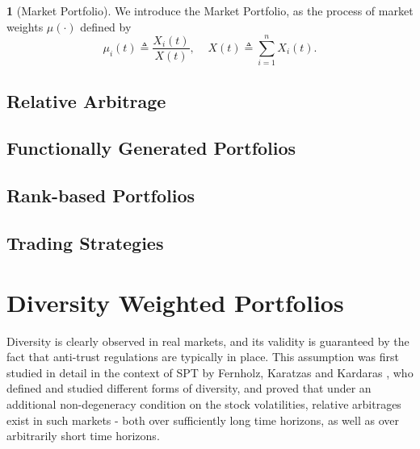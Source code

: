 \documentclass[british]{amsart}
\numberwithin{equation}{section}
\numberwithin{figure}{section}
\theoremstyle{plain}
\theoremstyle{definition}
\newtheorem{defn}[thm]{\protect\definitionname}
\theoremstyle{plain}
\theoremstyle{plain}
\theoremstyle{plain}
\theoremstyle{remark}
\providecommand{\definitionname}{Definition}
\begin{document}
\begin{defn}[Market Portfolio]
We introduce the Market Portfolio, as the process of market weights $\mu(\cdot)$ 
defined by \begin{equation}
	\mu_{i}(t)\triangleq\frac{X_{i}(t)}{X(t)},\;\;\;\;X(t)\triangleq\sum_{i=1}^{n}X_{i}(t).
\end{equation}
\end{defn}

\subsection{Relative Arbitrage}
\subsection{Functionally Generated Portfolios}
\subsection{Rank-based Portfolios}
\subsection{Trading Strategies}

\section{Diversity Weighted Portfolios}

Diversity is clearly observed in real markets, and its validity is guaranteed by 
the fact that anti-trust regulations are typically in place. This assumption was 
first studied in detail in the context of SPT by Fernholz, Karatzas and Kardaras 
\cite{fernholz2005}, who defined and studied different forms of diversity, and 
proved that under an additional non-degeneracy condition on the stock 
volatilities, relative arbitrages exist in such markets - both over sufficiently 
long time horizons, as well as over arbitrarily short time horizons.

\printbibliography
\end{document}
